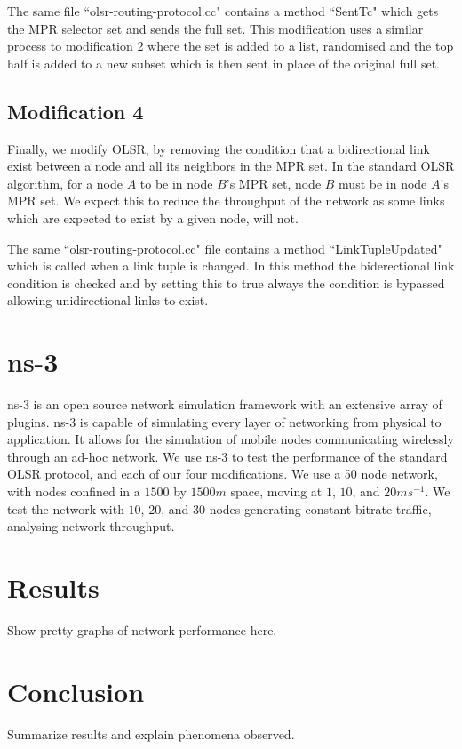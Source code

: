 \documentclass[12pt,a4paper]{article}
\begin{document}
The same file ``olsr-routing-protocol.cc" contains a method ``SentTc" which gets the MPR selector set and sends the full set. This modification uses a similar process to modification 2 where the set is added to a list, randomised and the top half is added to a new subset which is then sent in place of the original full set.

\subsection{Modification 4}
Finally, we modify OLSR, by removing the condition that a bidirectional link exist between a node and all its neighbors in the MPR set. In the standard OLSR algorithm, for a node \(A\) to be in node \(B\)'s MPR set, node \(B\) must be in node \(A\)'s MPR set. We expect this to reduce the throughput of the network as some links which are expected to exist by a given node, will not.

The same ``olsr-routing-protocol.cc" file contains a method ``LinkTupleUpdated" which is called when a link tuple is changed. In this method the biderectional link condition is checked and by setting this to true always the condition is bypassed allowing unidirectional links to exist.

\section{ns-3}
ns-3 is an open source network simulation framework with an extensive array of plugins. ns-3 is capable of simulating every layer of networking from physical to application. It allows for the simulation of mobile nodes communicating wirelessly through an ad-hoc network. We use ns-3 to test the performance of the standard OLSR protocol, and each of our four modifications. We use a 50 node network, with nodes confined in a \(1500\) by \(1500m\) space, moving at \(1\), \(10\), and \(20ms^{-1}\). We test the network with \(10\), \(20\), and \(30\) nodes generating constant bitrate traffic, analysing network throughput.

\section{Results}
Show pretty graphs of network performance here.

\section{Conclusion}
Summarize results and explain phenomena observed.



\end{document}
